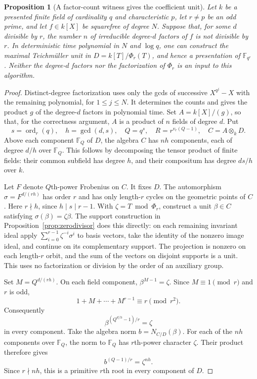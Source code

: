 \documentclass[11pt]{article}
\newcommand{\F}{\mathbb F}
\newcommand{\ord}{\operatorname{ord}}
\newtheorem{proposition}[theorem]{Proposition}
\theoremstyle{definition}
\theoremstyle{remark}
\begin{document}
\begin{proposition}[A factor-count witness gives the coefficient unit]
\label{prop:factorcount-transfer}
Let $k$ be a presented finite field of cardinality $q$ and
characteristic $p$, let $r\ne p$ be an odd prime, and let
$f\in k[X]$ be squarefree of degree $N$.
Suppose that, for some $d$ divisible by $r$, the number $n$
of irreducible degree-$d$ factors of $f$ is not divisible by $r$.
In deterministic time polynomial in $N$ and $\log q$, one can
construct the maximal Teichm\"uller unit in
$D=k[T]/\Phi_r(T)$, and hence a presentation of $\F_{q^r}$.
Neither the degree-$d$ factors nor the factorization of $\Phi_r$
is an input to this algorithm.
\end{proposition}
\begin{proof}
Distinct-degree factorization uses only the gcds of successive
$X^{q^j}-X$ with the remaining polynomial, for $1\leq j\leq N$.
It determines the counts and gives the product $g$ of the degree-$d$
factors in polynomial time. Set $A=k[X]/(g)$, so that,
for the correctness argument, $A$ is a product of $n$ fields of
degree $d$. Put
\[
 s=\ord_r(q),\quad h=\gcd(d,s),\quad Q=q^s,\quad
 R=r^{v_r(Q-1)},\quad C=A\otimes_kD.
\]
Above each component $\F_Q$ of $D$, the algebra $C$ has
$nh$ components, each of degree $d/h$ over $\F_Q$.
This follows by decomposing the tensor product of finite fields:
their common subfield has degree $h$, and their compositum has
degree $ds/h$ over $k$.

Let $F$ denote $Q$th-power Frobenius on $C$. It fixes $D$.
The automorphism $\sigma=F^{d/(rh)}$ has order $r$ and
has only length-$r$ cycles on the geometric points of $C$.
Here $r\nmid h$, since $h\mid s\mid r-1$.
With $\zeta=T\bmod\Phi_r$, construct a unit
$\beta\in C$ satisfying $\sigma(\beta)=\zeta\beta$.
The support construction in Proposition~\ref{prop:zerodivisor}
does this directly: on each remaining invariant ideal apply
$\sum_{i=0}^{r-1}\zeta^{-i}\sigma^i$ to basis vectors,
take the identity of the nonzero image ideal, and continue on
its complementary support. The projection is nonzero on
each length-$r$ orbit, and the sum of the vectors on disjoint
supports is a unit. This uses no factorization or division
by the order of an auxiliary group.

Set $M=Q^{d/(rh)}$. On each field component,
$\beta^{M-1}=\zeta$. Since $M\equiv1\pmod r$ and $r$
is odd,
\[
 1+M+\cdots+M^{r-1}\equiv r\pmod{r^2}.
\]
Consequently
\[
 \beta^{(Q^{d/h}-1)/r}=\zeta
\]
in every component. Take the algebra norm $b=N_{C/D}(\beta)$.
For each of the $nh$ components over $\F_Q$, the norm to
$\F_Q$ has $r$th-power character $\zeta$. Their product
therefore gives
\[
 b^{(Q-1)/r}=\zeta^{nh}.
\]
Since $r\nmid nh$, this is a primitive $r$th root in every
component of $D$.


\end{proof}
\end{document}
